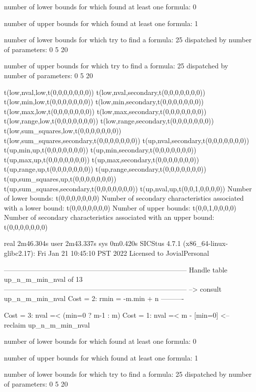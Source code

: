 number of lower bounds for which found at least one formula: 0

number of upper bounds for which found at least one formula: 1

number of lower bounds for which try to find a formula: 25
dispatched by number of parameters: 0  5  20

number of upper bounds for which try to find a formula: 25
dispatched by number of parameters: 0  5  20

t(low,nval,low,t(0,0,0,0,0,0,0))
t(low,nval,secondary,t(0,0,0,0,0,0,0))
t(low,min,low,t(0,0,0,0,0,0,0))
t(low,min,secondary,t(0,0,0,0,0,0,0))
t(low,max,low,t(0,0,0,0,0,0,0))
t(low,max,secondary,t(0,0,0,0,0,0,0))
t(low,range,low,t(0,0,0,0,0,0,0))
t(low,range,secondary,t(0,0,0,0,0,0,0))
t(low,sum_squares,low,t(0,0,0,0,0,0,0))
t(low,sum_squares,secondary,t(0,0,0,0,0,0,0))
t(up,nval,secondary,t(0,0,0,0,0,0,0))
t(up,min,up,t(0,0,0,0,0,0,0))
t(up,min,secondary,t(0,0,0,0,0,0,0))
t(up,max,up,t(0,0,0,0,0,0,0))
t(up,max,secondary,t(0,0,0,0,0,0,0))
t(up,range,up,t(0,0,0,0,0,0,0))
t(up,range,secondary,t(0,0,0,0,0,0,0))
t(up,sum_squares,up,t(0,0,0,0,0,0,0))
t(up,sum_squares,secondary,t(0,0,0,0,0,0,0))
t(up,nval,up,t(0,0,1,0,0,0,0))
Number of lower bounds:                                             t(0,0,0,0,0,0,0)
Number of secondary characteristics associated with a lower bound:  t(0,0,0,0,0,0,0)
Number of upper bounds:                                             t(0,0,1,0,0,0,0)
Number of secondary characteristics associated with an upper bound: t(0,0,0,0,0,0,0)

real	2m46.304s
user	2m43.337s
sys	0m0.420s
SICStus 4.7.1 (x86_64-linux-glibc2.17): Fri Jan 21 10:45:10 PST 2022
Licensed to JovialPersonal


--------------------------------------------------------------------------------
Handle table up_n_m_min_nval of 13
--------------------------------------------------------------------------------
--> consult up_n_m_min_nval
Cost =  2:  rmin = -m.min + n
----------

Cost =  3:  nval =< (min=0 ? m-1 : m)
Cost =  1:  nval =< m - [min=0] %
<-- reclaim up_n_m_min_nval

number of lower bounds for which found at least one formula: 0

number of upper bounds for which found at least one formula: 1

number of lower bounds for which try to find a formula: 25
dispatched by number of parameters: 0  5  20

